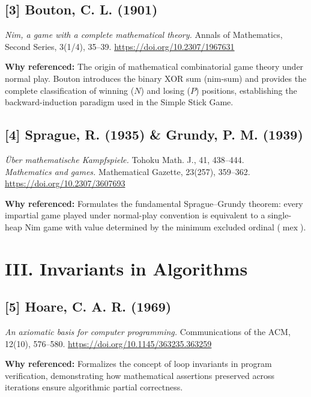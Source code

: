\documentclass[11pt]{article}
\begin{document}
\subsection*{[3] Bouton, C. L. (1901)}
\textit{Nim, a game with a complete mathematical theory.}
Annals of Mathematics, Second Series, 3(1/4), 35--39.
\url{https://doi.org/10.2307/1967631}

\textbf{Why referenced:}
The origin of mathematical combinatorial game theory under normal play. Bouton introduces the binary XOR sum (nim-sum) and provides the complete classification of winning ($N$) and losing ($P$) positions, establishing the backward-induction paradigm used in the Simple Stick Game.

\vspace{1em}

\subsection*{[4] Sprague, R. (1935) \& Grundy, P. M. (1939)}
\textit{Über mathematische Kampfspiele.} Tohoku Math. J., 41, 438--444. \\
\textit{Mathematics and games.} Mathematical Gazette, 23(257), 359--362.
\url{https://doi.org/10.2307/3607693}

\textbf{Why referenced:}
Formulates the fundamental Sprague--Grundy theorem: every impartial game played under normal-play convention is equivalent to a single-heap Nim game with value determined by the minimum excluded ordinal ($\operatorname{mex}$).

\section*{III. Invariants in Algorithms}

\subsection*{[5] Hoare, C. A. R. (1969)}
\textit{An axiomatic basis for computer programming.}
Communications of the ACM, 12(10), 576--580.
\url{https://doi.org/10.1145/363235.363259}

\textbf{Why referenced:}
Formalizes the concept of loop invariants in program verification, demonstrating how mathematical assertions preserved across iterations ensure algorithmic partial correctness.
\end{document}
